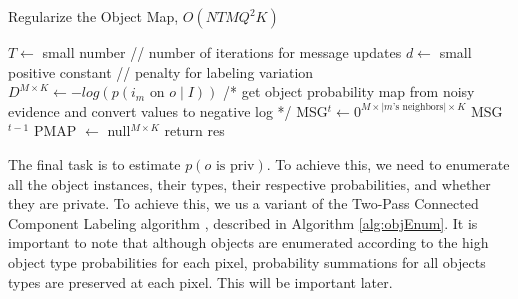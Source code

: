 \documentclass[11pt]{article}
\begin{document}
\begin{algorithm}[h!]\label{alg:regObjMap}
\caption{Regularize the Object Map, $O(NTMQ^2K)$}
$T \leftarrow$ small number // number of iterations for message updates\;
$d \leftarrow$ small positive constant // penalty for labeling variation\;
$D^{M \times K} \leftarrow -log(p(i_m \textrm{ on } o \mid I))$ /* get object probability map from noisy evidence and convert values to negative log */\;
MSG$^t \leftarrow 0^{M \times \lvert m\textrm{'s neighbors} \rvert \times K}$\;
MSG$^{t-1}$\;
PMAP $\leftarrow$ null$^{M \times K}$\;
return res\;
\end{algorithm}


The final task is to estimate $p(o \textrm{ is priv})$.  To achieve this, we need to enumerate all the object instances, their types, their respective probabilities, and whether they are private.  To achieve this, we us a variant of the Two-Pass Connected Component Labeling algorithm \cite{hoshen1976percolation}, described in Algorithm \ref{alg:objEnum}.  It is important to note that although objects are enumerated according to the high object type probabilities for each pixel, probability summations for all objects types are preserved at each pixel.  This will be important later.
\end{document}
